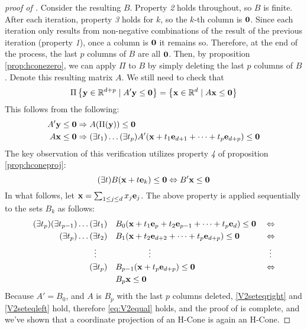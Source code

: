\begin{proof}[proof of \Vproj]
	Consider the resulting $B$.  Property \textit{2} holds throughout, so $B$ is finite.  After each iteration, property \textit{3} holds for $k$, so the $k$-th column is $\mathbf{0}$.  Since each iteration only results from non-negative combinations of the result of the previous iteration (property \textit{1}), once a column is $\mathbf{0}$ it remains so.  Therefore, at the end of the process, the last $p$ columns of $B$ are all $\mathbf{0}$.  Then, by proposition \ref{prop:hconezero}, we can apply $\Pi$ to $B$ by simply deleting the last $p$ columns of $B$.  Denote this resulting matrix $A$.  We still need to check that
	\begin{equation}\label{eq:V2equal}
		\Pi\left\{\mathbf{y}\in\mathbb{R}^{d+p}\;|\; A'\mathbf{y}\leq\mathbf{0}\right\} = \left\{\mathbf{x}\in\mathbb{R}^{d}\;|\; A\mathbf{x}\leq\mathbf{0}\right\}
	\end{equation}
	This follows from the following:
	\begin{align}
		A'\mathbf{y} & \leq \mathbf{0} \Rightarrow A(\Pi(\mathbf{y})) \leq \mathbf{0} \label{V2seteqright}                                                           \\
		A\mathbf{x}  & \leq \mathbf{0} \Rightarrow (\exists t_1)\dots(\exists t_p) A'(\mathbf{x}+t_1\mathbf{e}_{d+1}+\cdots+t_p\mathbf{e}_{d+p}) \leq \mathbf{0} \label{V2seteqleft}
	\end{align}
	The key observation of this verification utilizes property \textit{4} of proposition \ref{prop:hconeproj}:
	\[ (\exists t)B(\mathbf{x} + t\mathbf{e}_k) \leq \mathbf{0} \Leftrightarrow B'\mathbf{x} \leq \mathbf{0} \]
	In what follows, let $\mathbf{x} = \sum_{1 \leq j \leq d}x_j\mathbf{e}_j$.  The above property is applied sequentially to the sets $B_k$ as follows:
	\begin{alignat*}{2}
		(\exists t_p)(\exists t_{p-1})\dots(\exists t_1)                & \quad
		B_0(\mathbf{x} + t_1\mathbf{e}_{p} + t_2\mathbf{e}_{p-1} + \dots + t_p\mathbf{e}_{d}) \leq \mathbf{0}\; & \Leftrightarrow                                                 \\
		(\exists t_p)\dots(\exists t_2)                                 & \quad
		B_1(\mathbf{x} + t_2\mathbf{e}_{d+2} + \dots + t_p\mathbf{e}_{d+p})
		\leq \mathbf{0}                                                         & \Leftrightarrow                                                 \\
		\vdots \hspace{1.3em}                                           & \hspace{5em}\vdots                       & \vdots\hspace{0.4em} \\
		(\exists t_p)                                                   & \quad B_{p-1}(\mathbf{x} + t_p\mathbf{e}_{d+p})  \leq \mathbf{0} & \Leftrightarrow      \\
		                                                                & \quad B_{p}\mathbf{x}  \leq \mathbf{0}                   &
	\end{alignat*}
	Because $A' = B_0$, and $A$ is $B_p$ with the last $p$ columns deleted, \eqref{V2seteqright} and \eqref{V2seteqleft} hold, therefore \eqref{eq:V2equal} holds, and the proof of {\Vproj} is complete, and we've shown that a coordinate projection of an H-Cone is again an H-Cone.
\end{proof}


